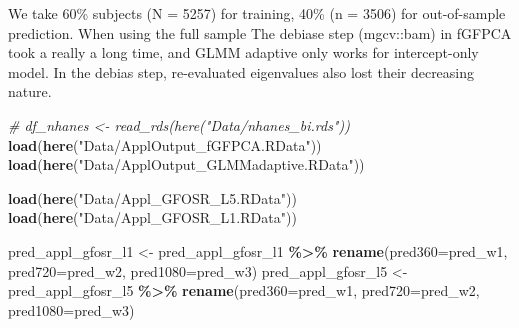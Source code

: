 \documentclass[
]{article}
\newenvironment{Shaded}{\begin{snugshade}}{\end{snugshade}}
\newcommand{\AttributeTok}[1]{\textcolor[rgb]{0.13,0.29,0.53}{#1}}
\newcommand{\CommentTok}[1]{\textcolor[rgb]{0.56,0.35,0.01}{\textit{#1}}}
\newcommand{\FunctionTok}[1]{\textcolor[rgb]{0.13,0.29,0.53}{\textbf{#1}}}
\newcommand{\NormalTok}[1]{#1}
\newcommand{\OtherTok}[1]{\textcolor[rgb]{0.56,0.35,0.01}{#1}}
\newcommand{\SpecialCharTok}[1]{\textcolor[rgb]{0.81,0.36,0.00}{\textbf{#1}}}
\newcommand{\StringTok}[1]{\textcolor[rgb]{0.31,0.60,0.02}{#1}}
\begin{document}
We take 60\% subjects (N = 5257) for training, 40\% (n = 3506) for
out-of-sample prediction. When using the full sample The debiase step
(mgcv::bam) in fGFPCA took a really a long time, and GLMM adaptive only
works for intercept-only model. In the debias step, re-evaluated
eigenvalues also lost their decreasing nature.

\begin{Shaded}
\begin{Highlighting}[]
\CommentTok{\# df\_nhanes \textless{}{-} read\_rds(here("Data/nhanes\_bi.rds"))}
\FunctionTok{load}\NormalTok{(}\FunctionTok{here}\NormalTok{(}\StringTok{"Data/ApplOutput\_fGFPCA.RData"}\NormalTok{))}
\FunctionTok{load}\NormalTok{(}\FunctionTok{here}\NormalTok{(}\StringTok{"Data/ApplOutput\_GLMMadaptive.RData"}\NormalTok{))}

\FunctionTok{load}\NormalTok{(}\FunctionTok{here}\NormalTok{(}\StringTok{"Data/Appl\_GFOSR\_L5.RData"}\NormalTok{))}
\FunctionTok{load}\NormalTok{(}\FunctionTok{here}\NormalTok{(}\StringTok{"Data/Appl\_GFOSR\_L1.RData"}\NormalTok{))}

\NormalTok{pred\_appl\_gfosr\_l1 }\OtherTok{\textless{}{-}}\NormalTok{ pred\_appl\_gfosr\_l1 }\SpecialCharTok{\%\textgreater{}\%}
  \FunctionTok{rename}\NormalTok{(}\AttributeTok{pred360=}\NormalTok{pred\_w1, }\AttributeTok{pred720=}\NormalTok{pred\_w2, }\AttributeTok{pred1080=}\NormalTok{pred\_w3)}
\NormalTok{pred\_appl\_gfosr\_l5 }\OtherTok{\textless{}{-}}\NormalTok{ pred\_appl\_gfosr\_l5 }\SpecialCharTok{\%\textgreater{}\%}
  \FunctionTok{rename}\NormalTok{(}\AttributeTok{pred360=}\NormalTok{pred\_w1, }\AttributeTok{pred720=}\NormalTok{pred\_w2, }\AttributeTok{pred1080=}\NormalTok{pred\_w3)}
\end{Highlighting}
\end{Shaded}
\end{document}
